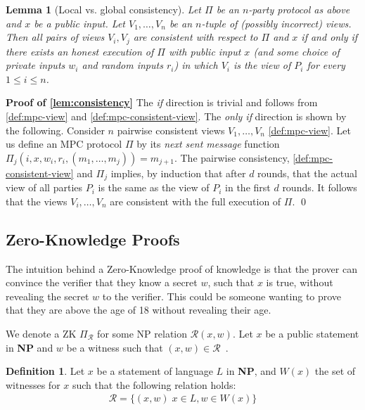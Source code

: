 \documentclass[11pt]{report}
\theoremstyle{definition}
\newtheorem{definition}{Definition}[section]
\theoremstyle{plain}
\newtheorem{lemma}{Lemma}[section]
\begin{document}
\begin{lemma}[Local vs. global consistency]\label{lem:consistency}
  Let $\Pi$ be an $n$-party protocol as above and $x$ be a public input.
  Let $V_1, \dots, V_n$ be an $n$-tuple of (possibly incorrect) views. Then all pairs of views $V_i, V_j$ are consistent with respect to $\Pi$ and $x$ if and only if there exists an honest execution of $\Pi$ with public input $x$ (and some choice of private inputs $w_i$ and random inputs $r_i$) in which $V_i$ is the view of $P_i$ for every $1 \leq i \leq n$.
\end{lemma}

\textbf{Proof of \autoref{lem:consistency}} The \textit{if} direction is trivial and follows from \autoref{def:mpc-view} and \autoref{def:mpc-consistent-view}.
The \textit{only if} direction is shown by the following. Consider $n$ pairwise consistent views $V_1, \dots, V_n$ \autoref{def:mpc-view}. Let us define an MPC protocol $\Pi$ by its \textit{next sent message} function $\Pi_j(i,x,w_i,r_i, (m_1, \dots, m_j)) = m_{j+1}$. The pairwise consistency, \autoref{def:mpc-consistent-view} and $\Pi_j$ implies, by induction that after $d$ rounds, that the actual view of all parties $P_i$ is the same as the view of $P_i$ in the first $d$ rounds. It follows that the views $V_i, \dots, V_n$ are consistent with the full execution of $\Pi$. \qed

\subsection{Zero-Knowledge Proofs}\label{sec:zk}
The intuition behind a Zero-Knowledge proof of knowledge is that the prover can convince the verifier that they know a secret $w$, such that $x$ is true, without revealing the secret $w$ to the verifier. This could be someone wanting to prove that they are above the age of 18 without revealing their age.

We denote a ZK $\Pi_{\mathcal{R}}$ for some NP relation $\mathcal{R}(x, w)$. Let $x$ be a public statement in \textbf{NP} and $w$ be a witness such that $(x, w) \in \mathcal{R}$~\cite{feneuil2023threshold}.
\begin{definition}
  Let $x$ be a statement of language $L$ in \textbf{NP}, and $W(x)$ the set of witnesses for $x$ such that the following relation holds:
  \begin{align*}
    \mathcal{R} = \{(x, w)\; x \in L, w \in W(x)\}
  \end{align*}
\end{definition}
\end{document}
